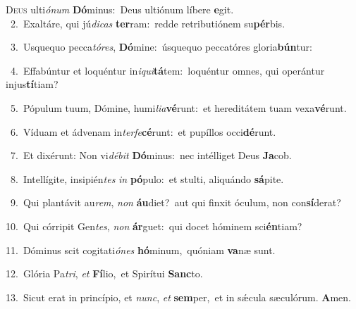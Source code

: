\lettrine{\initial\textcolor{\initialcolor}{D}}{eus} ulti\-\textit{ó}\-\textit{num} \textbf{Dó}\-minus:~\star Deus ultiónum líbere \textbf{e}\-git.\\
{\numbfont\textcolor{\numbcolor}{~2.}}~Exaltáre, qui jú\-\textit{di}\-\textit{cas} \textbf{ter}\-ram:~\star redde retributiónem su\-\textbf{pér}\-bis.\par
{\numbfont\textcolor{\numbcolor}{~3.}}~Usquequo pecca\-\textit{tó}\-\textit{res}, \textbf{Dó}\-mine:~\star úsquequo peccatóres gloria\-\textbf{bún}\-tur:\par
{\numbfont\textcolor{\numbcolor}{~4.}}~Effabúntur et loquéntur in\-\textit{i}\-\textit{qui}\textbf{tá}tem:~\star loquéntur omnes, qui operántur injus\-\textbf{tí}\-tiam?\par
{\numbfont\textcolor{\numbcolor}{~5.}}~Pópulum tuum, Dómine, humi\-\textit{li}\-\textit{a}\textbf{vé}runt:~\star et hereditátem tuam vexa\-\textbf{vé}\-runt.\par
{\numbfont\textcolor{\numbcolor}{~6.}}~Víduam et ádvenam in\-\textit{ter}\-\textit{fe}\textbf{cé}runt:~\star et pupíllos occi\-\textbf{dé}\-runt.\par
{\numbfont\textcolor{\numbcolor}{~7.}}~Et dixérunt: Non vi\-\textit{dé}\-\textit{bit} \textbf{Dó}\-minus:~\star nec intélliget Deus \textbf{Ja}\-cob.\par
{\numbfont\textcolor{\numbcolor}{~8.}}~Intellígite, insipién\textit{tes} \textit{in} \textbf{pó}\-pulo:~\star et stulti, aliquándo \textbf{sá}\-pite.\par
{\numbfont\textcolor{\numbcolor}{~9.}}~Qui plantávit au\-\textit{rem}\-, \textit{non} \textbf{áu}\-diet?~\star aut qui finxit óculum, non con\-\textbf{sí}\-derat?\par
{\numbfont\textcolor{\numbcolor}{10.}}~Qui córripit Gen\-\textit{tes}\-, \textit{non} \textbf{ár}\-guet:~\star qui docet hóminem sci\-\textbf{én}\-tiam?\par
{\numbfont\textcolor{\numbcolor}{11.}}~Dóminus scit cogitati\-\textit{ó}\-\textit{nes} \textbf{hó}\-minum,~\star quóniam \textbf{va}\-næ sunt.\par
{\numbfont\textcolor{\numbcolor}{12.}}~Glória Pa\-\textit{tri}\-, \textit{et} \textbf{Fí}\-lio,~\star et Spirítui \textbf{Sanc}\-to.\par
{\numbfont\textcolor{\numbcolor}{13.}}~Sicut erat in princípio, et \textit{nunc}\-, \textit{et} \textbf{sem}\-per,~\star et in sǽcula sæculórum. \textbf{A}\-men.\par
